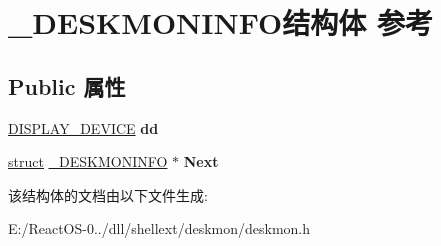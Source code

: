 \hypertarget{struct___d_e_s_k_m_o_n_i_n_f_o}{}\section{\+\_\+\+D\+E\+S\+K\+M\+O\+N\+I\+N\+F\+O结构体 参考}
\label{struct___d_e_s_k_m_o_n_i_n_f_o}
\subsection*{Public 属性}
\begin{DoxyCompactItemize}
\item 
\mbox{\label{struct___d_e_s_k_m_o_n_i_n_f_o_ae8acd7bad74b956fe930c50e88fe1b6d}} 
\hyperlink{struct___d_i_s_p_l_a_y___d_e_v_i_c_e_a}{D\+I\+S\+P\+L\+A\+Y\+\_\+\+D\+E\+V\+I\+CE} {\bfseries dd}
\item 
\mbox{\label{struct___d_e_s_k_m_o_n_i_n_f_o_a63236f8dc14d7e397259d7a7a90eaddc}} 
\hyperlink{interfacestruct}{struct} \hyperlink{struct___d_e_s_k_m_o_n_i_n_f_o}{\+\_\+\+D\+E\+S\+K\+M\+O\+N\+I\+N\+FO} $\ast$ {\bfseries Next}
\end{DoxyCompactItemize}


该结构体的文档由以下文件生成\+:\begin{DoxyCompactItemize}
\item 
E\+:/\+React\+O\+S-\/0../dll/shellext/deskmon/deskmon.\+h\end{DoxyCompactItemize}
